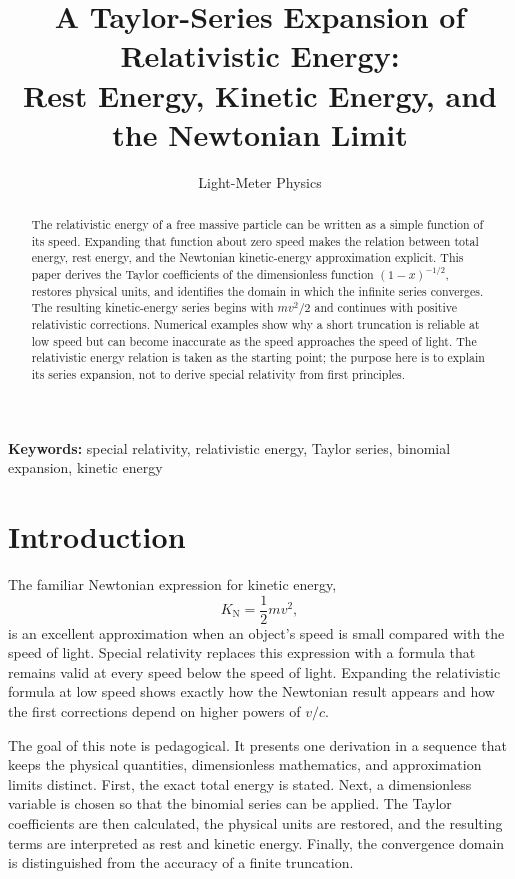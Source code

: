 \documentclass[12pt]{article}
\title{A Taylor-Series Expansion of Relativistic Energy:\\
Rest Energy, Kinetic Energy, and the Newtonian Limit}
\author{Light-Meter Physics}
\date{}
\begin{document}
\maketitle

\begin{abstract}
The relativistic energy of a free massive particle can be written as a simple function of its speed. Expanding that function about zero speed makes the relation between total energy, rest energy, and the Newtonian kinetic-energy approximation explicit. This paper derives the Taylor coefficients of the dimensionless function $(1-x)^{-1/2}$, restores physical units, and identifies the domain in which the infinite series converges. The resulting kinetic-energy series begins with $mv^2/2$ and continues with positive relativistic corrections. Numerical examples show why a short truncation is reliable at low speed but can become inaccurate as the speed approaches the speed of light. The relativistic energy relation is taken as the starting point; the purpose here is to explain its series expansion, not to derive special relativity from first principles.
\end{abstract}

\noindent\textbf{Keywords:} special relativity, relativistic energy, Taylor series, binomial expansion, kinetic energy

\section{Introduction}

The familiar Newtonian expression for kinetic energy,
\begin{equation}
  K_{\mathrm{N}}=\frac{1}{2}mv^2,
  \label{eq:newtonian-kinetic-energy}
\end{equation}
is an excellent approximation when an object's speed is small compared with the speed of light. Special relativity replaces this expression with a formula that remains valid at every speed below the speed of light. Expanding the relativistic formula at low speed shows exactly how the Newtonian result appears and how the first corrections depend on higher powers of $v/c$.

The goal of this note is pedagogical. It presents one derivation in a sequence that keeps the physical quantities, dimensionless mathematics, and approximation limits distinct. First, the exact total energy is stated. Next, a dimensionless variable is chosen so that the binomial series can be applied. The Taylor coefficients are then calculated, the physical units are restored, and the resulting terms are interpreted as rest and kinetic energy. Finally, the convergence domain is distinguished from the accuracy of a finite truncation.
\end{document}
